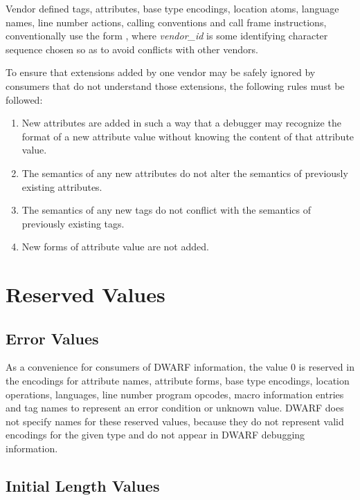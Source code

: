 Vendor defined tags, attributes, base type encodings, location
atoms, language names, line number actions, calling conventions
and call frame instructions, conventionally use the form
, where 
\textit{vendor\_id} is some identifying
character sequence chosen so as to avoid conflicts with
other vendors.

To ensure that extensions added by one vendor may be safely
ignored by consumers that do not understand those extensions,
the following rules must be followed:
\begin{enumerate}[1. ]

\item New attributes are added in such a way that a
debugger may recognize the format of a new attribute value
without knowing the content of that attribute value.

\item The semantics of any new attributes do not alter
the semantics of previously existing attributes.

\item The semantics of any new tags do not conflict with
the semantics of previously existing tags.

\item New forms of attribute value are not added.

\end{enumerate}


\section{Reserved Values}
\label{datarep:reservedvalues}
\subsection{Error Values}
\label{datarep:errorvalues}

As 
a convenience for consumers of DWARF information, the value
0 is reserved in the encodings for attribute names, attribute
forms, base type encodings, location operations, languages,
line number program opcodes, macro information entries and tag
names to represent an error condition or unknown value. DWARF
does not specify names for these reserved values, because they
do not represent valid encodings for the given type and do
not appear in DWARF debugging information.


\subsection{Initial Length Values}
\label{datarep:initiallengthvalues}

